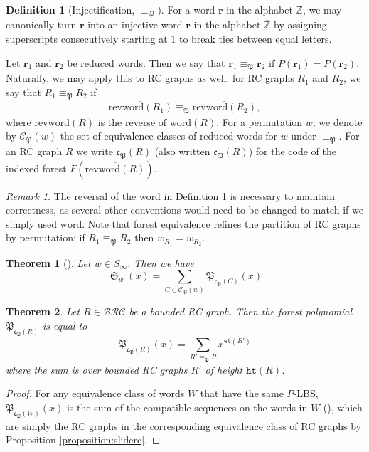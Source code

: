 \documentclass{amsart}
\newtheorem{theorem}{Theorem}[section]
\theoremstyle{definition}
\newtheorem{definition}[lemma]{Definition}
\theoremstyle{remark}
\newtheorem*{remark}{Remark}
\numberwithin{equation}{subsection}
\DeclareMathOperator{\sch}{\mathfrak{S}}
\newcommand{\wof}[1]{w_{#1}}
\newcommand{\wtt}{\mathtt{wt}}
\newcommand{\hr}{\mathtt{ht}}
\newcommand{\BRC}{\mathcal{BRC}}
\newcommand{\code}{\mathfrak{c}}
\newcommand{\forest}{\mathfrak{P}}
\newcommand{\fcode}{\mathfrak{c}_\forest}
\begin{document}
\begin{definition}[Injectification, $\equiv_\forest$] \label{definition:forestequivrc}
  For a word $\mathbf{r}$ in the alphabet $\mathbb{Z}$, we may canonically turn $\mathbf{r}$ into an injective word $\overline{\mathbf{r}}$ in the alphabet $\overline{\mathbb{Z}}$ by assigning superscripts consecutively starting at $1$ to break ties between equal letters.

Let $\mathbf{r}_1$ and $\mathbf{r}_2$ be reduced words. Then we say that $\mathbf{r}_1\equiv_\forest\mathbf{r}_2$ if $P(\overline{\mathbf{r}_1}) = P(\overline{\mathbf{r}_2})$. Naturally, we may apply this to RC graphs as well: for RC graphs $R_1$ and $R_2$, we say that $R_1\equiv_\forest R_2$ if 
$$\overline{\mathrm{revword}(R_1)}\equiv_\forest \overline{\mathrm{revword}(R_2)},$$ 
where $\mathrm{revword}(R)$ is the reverse of $\mathrm{word}(R)$. For a permutation $w$, we denote by $\mathcal{C}_\forest(w)$ the set of equivalence classes of reduced words for $w$ under $\equiv_\forest$. For an RC graph $R$ we write $\code_\forest(R)$ (also written $\fcode(R)$) for the code of the indexed forest $F(\overline{\mathrm{revword}(R)})$.
\end{definition}

\begin{remark}\label{remark:forestperm}
The reversal of the word in Definition \ref{definition:forestequivrc} is necessary to maintain correctness, as several other conventions would need to be changed to match if we simply used $\overline{\mathrm{word}}$. Note that forest equivalence refines the partition of RC graphs by permutation: if $R_1\equiv_\forest R_2$ then $\wof{R_1}=\wof{R_2}$.
\end{remark}

\begin{theorem}[{\cite[Theorem~1.4]{nadeau2024forest}}] \label{theorem:forestforest}
  Let $w\in S_\infty$. Then we have
  $$\sch_w(x) = \sum_{C\in \mathcal{C}_\forest(w)} \forest_{\code_\forest(C)}(x)$$
\end{theorem}

\begin{theorem}\label{theorem:forestformula}
Let $R\in \BRC$ be a bounded RC graph. Then the forest polynomial $\forest_{\fcode(R)}$ is equal to
$$\forest_{\fcode(R)}(x)=\sum_{R'\equiv_{\forest} R} x^{\wtt(R')}$$
where the sum is over bounded RC graphs $R'$ of height $\hr(R)$.
\end{theorem}
\begin{proof}
For any equivalence class of words $W$ that have the same $P$-LBS, $\forest_{\code_\forest(W)}(x)$ is the sum of the compatible sequences on the words in $W$ (\cite[Proposition~5.10]{nadeau2024forest}), which are simply the RC graphs in the corresponding equivalence class of RC graphs by Proposition \ref{proposition:sliderc}.
\end{proof}
\end{document}

